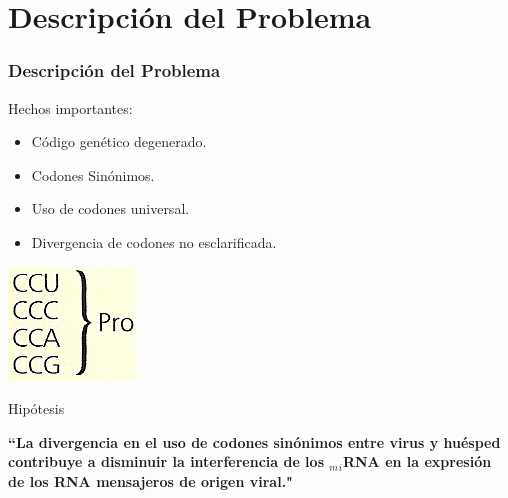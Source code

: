 \section{Descripción del Problema}
    \begin{frame}\frametitle{\textbf{Descripción del Problema}}
       \begin{block}{Hechos importantes:}
          \begin{minipage}{6cm\textwidth}
             \begin{itemize}
               \item Código genético degenerado.
               \item Codones Sinónimos.
               \item Uso de codones universal.
               \item Divergencia de codones no esclarificada.
             \end{itemize}  
           \end{minipage}
           \begin{minipage}{4cm}
               \hspace*{.7cm}\includegraphics[scale=.35]{images/codonesSinonimos.png}
           \end{minipage}            
       \end{block}

       \pause
       \begin{block}{Hipótesis}
         \par \textbf{``La divergencia en el uso de codones sinónimos entre virus y huésped contribuye a disminuir la interferencia de los $_m$$_i$RNA en la expresión de los RNA mensajeros de origen viral."}
     \end{block}
    \end{frame}
    
